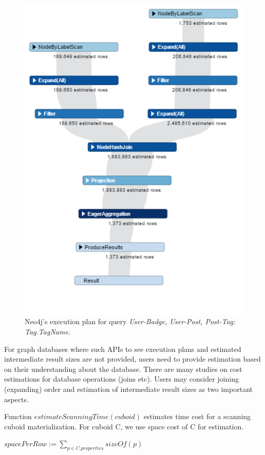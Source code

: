 \begin {figure}[H]
\centering
\includegraphics[scale=0.6]{pic/61.png}
\caption{Neo4j's execution plan for query \textit{User-Badge, User-Post, Post-Tag: Tag.TagName}.}
\label{fig:4:2}
\end{figure}

For graph databases where such APIs to see  execution plans and estimated intermediate result sizes are not provided, users need to provide estimation based on their understanding about the database. There are many studies on cost estimations for database operations (joins etc). Users may consider joining (expanding) order \cite{DBLP:conf/pods/Chaudhuri98} and estimation of intermediate result sizes  \cite{DBLP:conf/edbt/SwamiS94} as two important aspects. 

Function \textbf{$estimateScanningTime(cuboid)$} estimates time cost for a scanning cuboid materialization. For cuboid C, we use space cost of C for estimation. 

 $spacePerRow:= 
 \displaystyle{\sum_{p\in C.properties}sizeOf(p)}$
 
